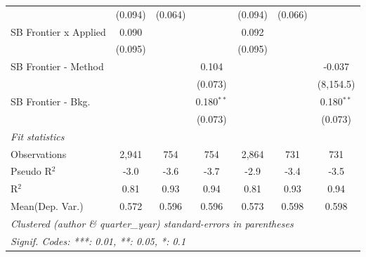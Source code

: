 \begin{tabular}{lcccccc}
                                & (0.094)       & (0.064)      &              & (0.094)       & (0.066)      &   \\   
   SB Frontier x Applied        & 0.090         &              &              & 0.092         &              &   \\   
                                & (0.095)       &              &              & (0.095)       &              &   \\   
   SB Frontier - Method         &               &              & 0.104        &               &              & -0.037\\   
                                &               &              & (0.073)      &               &              & (8,154.5)\\   
   SB Frontier - Bkg.           &               &              & 0.180$^{**}$ &               &              & 0.180$^{**}$\\   
                                &               &              & (0.073)      &               &              & (0.073)\\   
   \midrule
   \emph{Fit statistics}\\
   Observations                 & 2,941         & 754          & 754          & 2,864         & 731          & 731\\  
   Pseudo R$^2$                 & -3.0          & -3.6         & -3.7         & -2.9          & -3.4         & -3.5\\  
   R$^2$                        & 0.81          & 0.93         & 0.94         & 0.81          & 0.93         & 0.94\\  
Mean(Dep. Var.) & 0.572 & 0.596 & 0.596 & 0.573 & 0.598 & 0.598 \\
   \midrule \midrule
   \multicolumn{7}{l}{\emph{Clustered (author \& quarter\_year) standard-errors in parentheses}}\\
   \multicolumn{7}{l}{\emph{Signif. Codes: ***: 0.01, **: 0.05, *: 0.1}}\\
\end{tabular}
\par\endgroup
